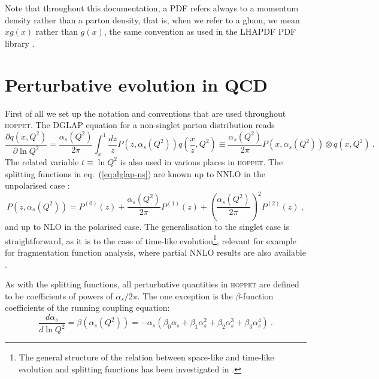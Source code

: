 \documentclass[12pt]{article}
\newcommand{\lp}{\left(}
\newcommand{\rp}{\right)}
\newcommand{\aq}{\alpha_s\left( Q^2 \right)}
\newcommand{\as}{\alpha_s}
\newcommand{\hoppet}{\textsc{hoppet}\xspace}
\begin{document}
Note 
that throughout this documentation, a PDF refers always to a momentum
density rather than a parton density, that is, when we refer to
a gluon, we mean $xg(x)$ rather than $g(x)$, the same convention
as used in the LHAPDF PDF library \cite{LHAPDF}.



\section{Perturbative evolution in QCD}
\label{sec:pqcd}
First of all we set up the notation and
conventions that are used throughout \hoppet. The DGLAP
equation for a non-singlet parton distribution reads
\begin{equation}
  \label{eq:dglap-ns}
  \frac{\partial q(x,Q^2)}{\partial \ln Q^2} = 
\frac{\aq}{2\pi}\int_x^1 \frac{dz}{z}
  P(z,\aq) q\lp \frac{x}{z},Q^2\rp \equiv 
\frac{\aq}{2\pi}  P(x,\aq) \otimes q\lp x,Q^2\rp \ .
\end{equation}
The related variable $t\equiv \ln Q^2$ is also used
in various places in \hoppet.
The splitting functions in eq.~(\ref{eq:dglap-ns})
are known up to NNLO in the 
unpolarised case \cite{Furmanski:1980cm,Curci:1980uw,NNLO-NS,NNLO-singlet}:
\begin{equation}
  \label{eq:dpdf}
   P(z,\aq)=P^{(0)}(z)+\frac{\aq}{2\pi}P^{(1)}(z)+
\lp \frac{\aq}{2\pi} \rp^2 P^{(2)}(z) \ ,
\end{equation}
and up to NLO \cite{Mertig:1995ny,Vogelsang:1996im} in the polarised case.
The generalisation to the singlet case is straightforward, as it
is 
to the case of time-like evolution\footnote{
The general structure of the relation between space-like
and time-like evolution and splitting functions
 has been investigated in \cite{Furmanski:1980cm,Curci:1980uw,Stratmann:1996hn,Dokshitzer:2005bf,Mitov:2006ic,Basso:2006nk,Dokshitzer:2006nm,Beccaria:2007bb}.}, 
relevant for example for fragmentation function analysis,
where partial NNLO results
are also available \cite{Mitov:2006ic}.


As with the splitting functions, all perturbative quantities in
\hoppet are defined to be coefficients of powers of $\as/2\pi$. The one
exception is the $\beta$-function coefficients of the running
coupling equation:
\begin{equation}
  \label{eq:as-ev}
  \frac{d\as}{d\ln Q^2} = \beta\lp \aq\rp = -\as (\beta_0\as +
  \beta_1\as^2 + 
  \beta_2\as^3 + 
  \beta_3\as^4) \ .
\end{equation}
\end{document}
